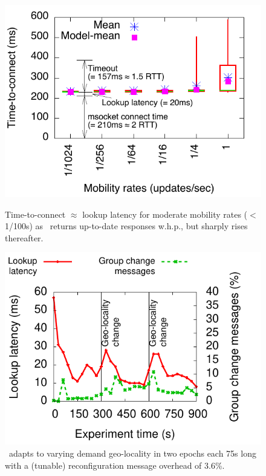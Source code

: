 \begin{figure}[t]
\begin{minipage}[b]{0.48\linewidth}
\centering
\includegraphics[scale=0.55]{graph/camera-ready/connect-time-msocket.pdf}
\caption{Time-to-connect $\approx$ lookup latency for moderate mobility rates ($<$1/100s)  as \auspice\ returns up-to-date responses w.h.p., but sharply rises thereafter.}
\label{fig:ttc}
\end{minipage}
\hspace{0.3cm}
\begin{minipage}[b]{0.48\linewidth}
\centering
\includegraphics[scale=0.55]{graph/camera-ready/latency_by_time.pdf}
\caption{\auspice\ adapts to varying demand geo-locality in two epochs each 75s long with a (tunable) reconfiguration message overhead of 3.6\%.}
\label{fig:latency-time}
\end{minipage}
\end{figure}



